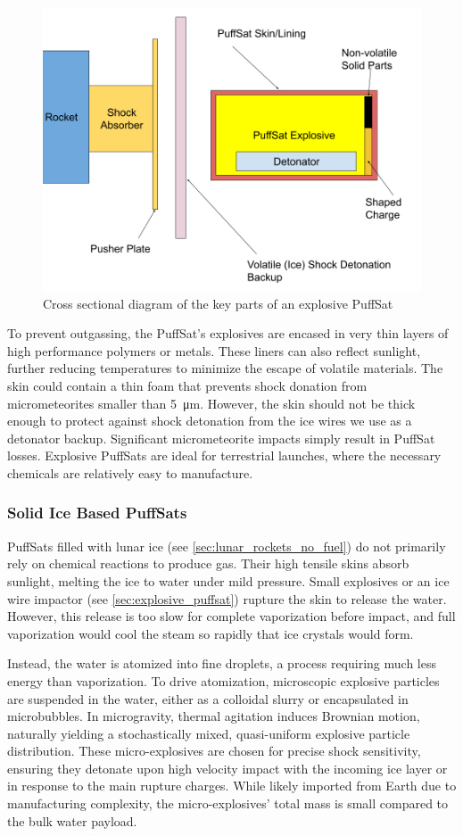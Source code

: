 \documentclass{article}
\begin{document}
\begin{figure}
    \centering
    \includegraphics[width=0.5\linewidth]{images/Explosive PuffSat.png}
    \caption{Cross sectional diagram of the key parts of an explosive PuffSat}
    \label{fig:explosive_puffsat}
\end{figure}

To prevent outgassing, the PuffSat's explosives are encased in very thin layers of high performance polymers or metals. These liners can also reflect sunlight, further reducing temperatures to minimize the escape of volatile materials. The skin could contain a thin foam that prevents shock donation from micrometeorites smaller than \SI{5}{\micro\meter}.  However, the skin should not be thick enough to protect against shock detonation from the ice wires we use as a detonator backup.  Significant micrometeorite impacts simply result in PuffSat losses.   Explosive PuffSats are ideal for terrestrial launches, where the necessary chemicals are relatively easy to manufacture.

\subsubsection{Solid Ice Based PuffSats} \label{sec:icy_puffsat}
PuffSats filled with lunar ice (see \autoref{sec:lunar_rockets_no_fuel}) do not primarily rely on chemical reactions to produce gas. Their high tensile skins absorb sunlight, melting the ice to water under mild pressure. Small explosives or an ice wire impactor (see \autoref{sec:explosive_puffsat}) rupture the skin to release the water. However, this release is too slow for complete vaporization before impact, and full vaporization would cool the steam so rapidly that ice crystals would form.

Instead, the water is atomized into fine droplets, a process requiring much less energy than vaporization. To drive atomization, microscopic explosive particles are suspended in the water, either as a colloidal slurry or encapsulated in microbubbles. In microgravity, thermal agitation induces Brownian motion, naturally yielding a stochastically mixed, quasi-uniform explosive particle distribution. These micro-explosives are chosen for precise shock sensitivity, ensuring they detonate upon high velocity impact with the incoming ice layer or in response to the main rupture charges. While likely imported from Earth due to manufacturing complexity, the micro-explosives' total mass is small compared to the bulk water payload.
\end{document}
